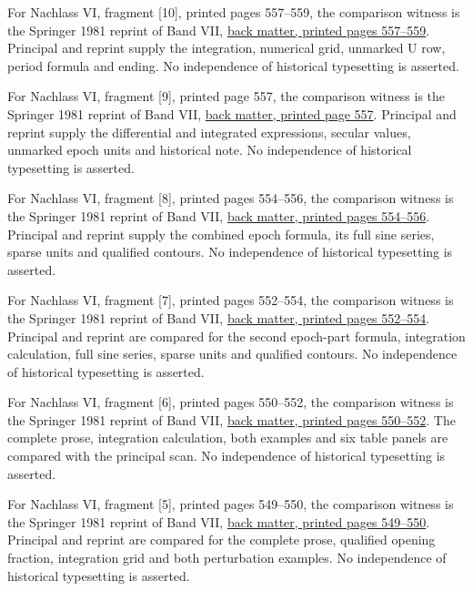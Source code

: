 For Nachlass VI, fragment [10], printed pages 557--559, the comparison witness is the Springer 1981 reprint of Band VII, \href{https://link.springer.com/content/pdf/bbm:978-3-642-92478-1/1}{back matter, printed pages 557--559}. Principal and reprint supply the integration, numerical grid, unmarked U row, period formula and ending. No independence of historical typesetting is asserted.



For Nachlass VI, fragment [9], printed page 557, the comparison witness is the Springer 1981 reprint of Band VII, \href{https://link.springer.com/content/pdf/bbm:978-3-642-92478-1/1}{back matter, printed page 557}. Principal and reprint supply the differential and integrated expressions, secular values, unmarked epoch units and historical note. No independence of historical typesetting is asserted.



For Nachlass VI, fragment [8], printed pages 554–556, the comparison witness is the Springer 1981 reprint of Band VII, \href{https://link.springer.com/content/pdf/bbm:978-3-642-92478-1/1}{back matter, printed pages 554–556}. Principal and reprint supply the combined epoch formula, its full sine series, sparse units and qualified contours. No independence of historical typesetting is asserted.



For Nachlass VI, fragment [7], printed pages 552–554, the comparison witness is the Springer 1981 reprint of Band VII, \href{https://link.springer.com/content/pdf/bbm:978-3-642-92478-1/1}{back matter, printed pages 552–554}. Principal and reprint are compared for the second epoch-part formula, integration calculation, full sine series, sparse units and qualified contours. No independence of historical typesetting is asserted.



For Nachlass VI, fragment [6], printed pages 550–552, the comparison witness is the Springer 1981 reprint of Band VII, \href{https://link.springer.com/content/pdf/bbm:978-3-642-92478-1/1}{back matter, printed pages 550–552}. The complete prose, integration calculation, both examples and six table panels are compared with the principal scan. No independence of historical typesetting is asserted.



For Nachlass VI, fragment [5], printed pages 549–550, the comparison witness is the Springer 1981 reprint of Band VII, \href{https://link.springer.com/content/pdf/bbm:978-3-642-92478-1/1}{back matter, printed pages 549–550}. Principal and reprint are compared for the complete prose, qualified opening fraction, integration grid and both perturbation examples. No independence of historical typesetting is asserted.



